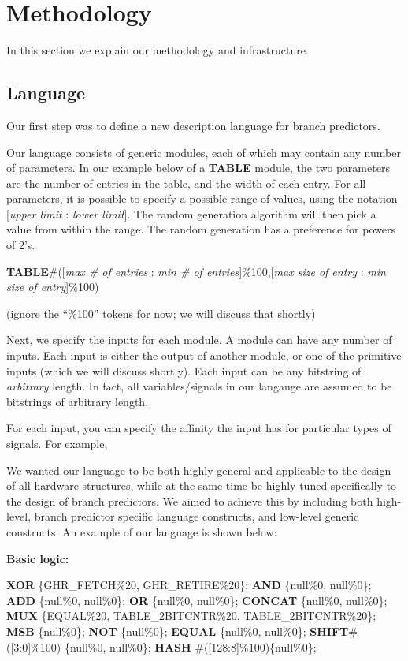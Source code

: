 \documentclass[conference]{IEEEtran}
\begin{document}
\section{Methodology}
In this section we explain our methodology and infrastructure.
\subsection{Language}
Our first step was to define a new description language for branch predictors. 

Our language consists of generic modules, each of which may contain any number of parameters. In our example below of a \textbf{TABLE} module, the two parameters are the number of entries in the table, and the width of each entry. For all parameters, it is possible to specify a possible range of values, using the notation [\emph{upper limit} : \emph{lower limit}]. The random generation algorithm will then pick a value from within the range. The random generation has a preference for powers of 2's. 

\begin{algorithmic}
\STATE \textbf{TABLE}\#([\emph{max \# of entries} : \emph{min \# of entries}]\%100,[\emph{max size of entry} : \emph{min size of entry}]\%100) 
\end{algorithmic}
(ignore the ``\%100'' tokens for now; we will discuss that shortly)

Next, we specify the inputs for each module. A module can have any number of inputs. Each input is either the output of another module, or one of the primitive inputs (which we will discuss shortly). Each input can be any bitstring of \emph{arbitrary} length. In fact, all variables/signals in our langauge are assumed to be bitstrings of arbitrary length.

For each input, you can specify the affinity the input has for particular types of signals. For example,  

We wanted our language to be both highly general and applicable to the design of all hardware structures, while at the same time be highly tuned specifically to the design of branch predictors. We aimed to achieve this by including both high-level, branch predictor specific language constructs, and low-level generic constructs. An example of our language is shown below:

\textbf{Basic logic:}
\begin{algorithmic}

\STATE \textbf{XOR} \{GHR\_FETCH\%20, GHR\_RETIRE\%20\};
\STATE \textbf{AND} \{null\%0, null\%0\};
\STATE \textbf{ADD} \{null\%0, null\%0\};
\STATE \textbf{OR}  \{null\%0, null\%0\};
\STATE \textbf{CONCAT} \{null\%0, null\%0\};
\STATE \textbf{MUX} \{EQUAL\%20, TABLE\_2BITCNTR\%20,
\STATE TABLE\_2BITCNTR\%20\};
\STATE \textbf{MSB} \{null\%0\};
\STATE \textbf{NOT} \{null\%0\};
\STATE \textbf{EQUAL} \{null\%0, null\%0\};
\STATE \textbf{SHIFT}\#([3:0]\%100) \{null\%0, null\%0\};
\STATE \textbf{HASH} \#([128:8]\%100)\{null\%0\};
\end{algorithmic}
\end{document}
